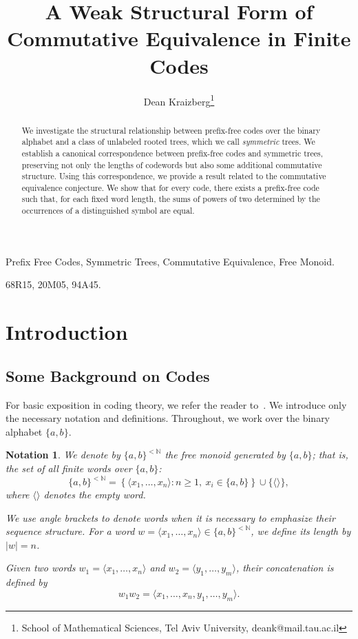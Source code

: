 \documentclass[a4,12pt]{article}%
\title{A Weak Structural Form of Commutative Equivalence in
Finite Codes}
\author{Dean Kraizberg\thanks{School of Mathematical Sciences, Tel Aviv University, deank@mail.tau.ac.il}}
\newtheorem{notation}[theorem]{Notation}
\begin{document}
\maketitle
\begin{abstract}
   We investigate the structural relationship between prefix-free codes over the binary alphabet and a class of unlabeled rooted trees, which we call \emph{symmetric} trees. We establish a canonical correspondence between prefix-free codes and symmetric trees, preserving not only the lengths of codewords but also some additional commutative structure. Using this correspondence, we provide a result related to the commutative equivalence conjecture. We show that for every code, there exists a prefix-free code such that, for each fixed word length, the sums of powers of two determined by the occurrences of a distinguished symbol are equal. 
\end{abstract}
 Prefix Free Codes, Symmetric Trees, Commutative Equivalence, Free Monoid.

 	68R15, 20M05, 94A45. 

\section{Introduction}
\subsection{Some Background on Codes}

For basic exposition in coding theory, we refer the reader to~\cite{CodingTheoryExpo}. We introduce only the necessary notation and definitions. Throughout, we work over the binary alphabet $\{a,b\}$.

\begin{notation}
We denote by $\{a,b\}^{<\mathbb{N}}$ the free monoid generated by $\{a,b\}$; that is, the set of all finite words over $\{a,b\}$:
\[
\{a,b\}^{<\mathbb{N}}
=
\left\{
\langle x_1,\dots,x_n \rangle : n \ge 1,\ x_i \in \{a,b\}
\right\}
\cup \{\langle \rangle\},
\]
where $\langle \rangle$ denotes the empty word.

We use angle brackets to denote words when it is necessary to emphasize their sequence structure. For a word $w = \langle x_1,\dots,x_n \rangle \in \{a,b\}^{<\mathbb{N}}$, we define its length by $\lvert w \rvert = n$.

Given two words $w_1 = \langle x_1,\dots,x_n \rangle$ and $w_2 = \langle y_1,\dots,y_m \rangle$, their concatenation is defined by
\[
w_1 w_2 = \langle x_1,\dots,x_n, y_1,\dots,y_m \rangle.
\]
\end{notation}
\end{document}
